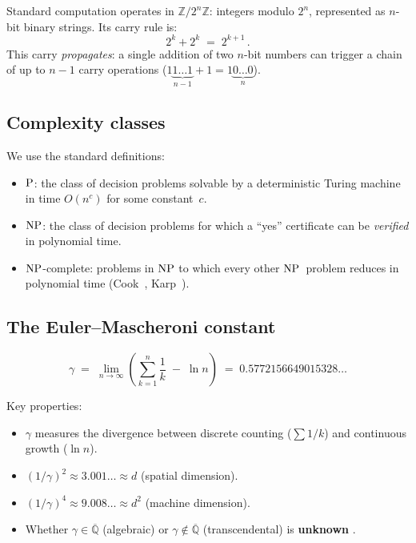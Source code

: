 \documentclass[12pt, a4paper]{article}
\theoremstyle{plain}
\theoremstyle{definition}
\theoremstyle{remark}
\newcommand{\Z}{\mathbb{Z}}
\newcommand{\Q}{\mathbb{Q}}
\newcommand{\NP}{\textup{NP}}
\newcommand{\PP}{\textup{P}}
\begin{document}
Standard computation operates in $\Z/2^n\Z$: integers modulo $2^n$,
represented as $n$-bit binary strings.  Its carry rule is:
\begin{equation}\label{eq:binary-carry}
  2^k + 2^k \;=\; 2^{k+1}\,.
\end{equation}
This carry \emph{propagates}: a single addition of two $n$-bit
numbers can trigger a chain of up to $n-1$ carry operations
($1\underbrace{1\ldots1}_{n-1} + 1 = 1\underbrace{0\ldots0}_{n}$).

\subsection{Complexity classes}

We use the standard definitions:
\begin{itemize}[nosep]
  \item $\PP$: the class of decision problems solvable by a
        deterministic Turing machine in time $O(n^c)$ for some
        constant~$c$.
  \item $\NP$: the class of decision problems for which a ``yes''
        certificate can be \emph{verified} in polynomial time.
  \item $\NP$-complete: problems in $\NP$ to which every other
        $\NP$~problem reduces in polynomial time
        (Cook~\cite{cook1971}, Karp~\cite{karp1972}).
\end{itemize}

\subsection{The Euler--Mascheroni constant}

\begin{equation}\label{eq:gamma}
  \gamma \;=\; \lim_{n \to \infty}
    \left(\sum_{k=1}^{n}\frac{1}{k} \;-\; \ln n\right)
  \;=\; 0.5772156649015328\ldots
\end{equation}

Key properties:
\begin{itemize}[nosep]
  \item $\gamma$ measures the divergence between discrete counting
        ($\sum 1/k$) and continuous growth ($\ln n$).
  \item $(1/\gamma)^2 \approx 3.001\ldots \approx d$ (spatial
        dimension).
  \item $(1/\gamma)^4 \approx 9.008\ldots \approx d^2$ (machine
        dimension).
  \item Whether $\gamma \in \overline{\Q}$ (algebraic) or $\gamma
        \notin \overline{\Q}$ (transcendental) is \textbf{unknown}
        \cite{lagarias2013euler}.
\end{itemize}
\end{document}
